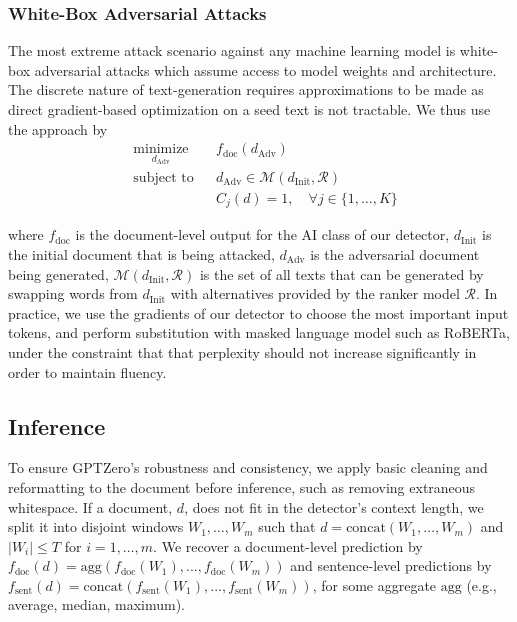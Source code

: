 \documentclass[11pt]{article}
\newcommand{\alexc}[1]{{\color{red}{AC: #1}}}
\newcommand{\alexa}[1]{{\color{blue}{AA: #1}}}
\newcommand{\lee}[1]{{\color{purple}{DL: #1}}}
\newcommand{\doc}{\mathrm{doc}}
\newcommand{\sent}{\mathrm{sent}}
\newcommand{\agg}{\mathrm{agg}}
\newcommand{\concat}{\mathrm{concat}}
\newcommand{\gptzero}{GPTZero}
\begin{document}
\subsubsection{White-Box Adversarial Attacks}
The most extreme attack scenario against any machine learning model is white-box adversarial attacks which assume access to model weights and architecture. The discrete nature of text-generation requires approximations to be made as direct gradient-based optimization on a seed text is not tractable. We thus use the approach by \cite{Zhou2024-ud} 
\begin{equation}
\begin{aligned}
& \underset{d_{\text{Adv}}}{\text{minimize}}
& & f_{\text{doc}}(d_{\text{Adv}}) \\
& \text{subject to}
& & d_{\text{Adv}} \in \mathcal{M}(d_{\text{Init}}, \mathcal{R}) \\
& & & C_j(d) = 1, \quad \forall j \in \{1, \dots, K\}
\end{aligned}
\end{equation}

where $f_{\text{doc}}$ is the document-level output for the AI class of our detector, $d_{\text{Init}}$ is the initial document that is being attacked, 
$d_{\text{Adv}}$ is the adversarial document being generated, $\mathcal{M}(d_{\text{Init}}, \mathcal{R})$ is the set of all texts that can be generated by swapping words from $d_{\text{Init}}$ with alternatives provided by the ranker model $\mathcal{R}$. In practice, we use the gradients of our detector to choose the most important input tokens, and perform substitution with  masked language model such as RoBERTa, under the constraint that that perplexity should not increase significantly in order to maintain fluency.

\subsection{Inference}
To ensure \gptzero{}'s robustness and consistency, we apply basic cleaning and reformatting to the document before inference, such as removing extraneous whitespace.
If a document, $d$, does not fit in the detector's context length, we split it into disjoint windows $W_1,\ldots,W_m$ such that $d=\concat(W_1,\ldots,W_m)$ and $|W_i|\le T$ for ${i=1,\ldots,m}$.
We recover a document-level prediction by
$f_{\doc}(d) = \agg(f_{\doc}(W_{1}), ..., f_{\doc}(W_{m}))$
and sentence-level predictions by
$f_{\sent}(d) = \concat(f_{\sent}(W_{1}), ..., f_{\sent}(W_{m}))$,
for some aggregate $\agg$ (e.g., average, median, maximum).
\end{document}
